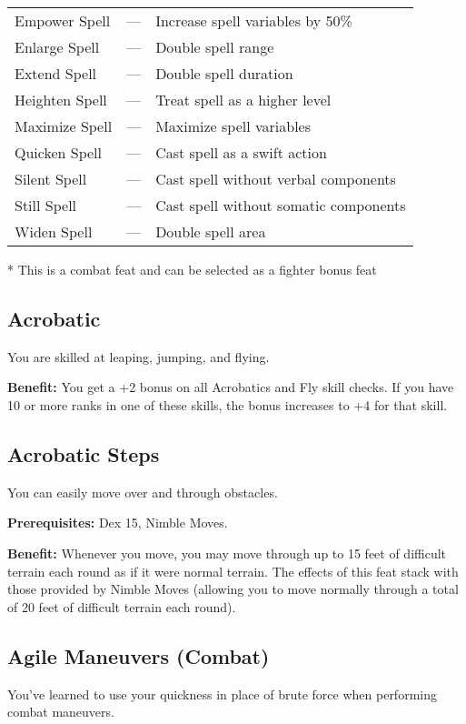 \begin{table}[]
\begin{tabular}{lll}
Empower Spell & — & Increase spell variables by 50\%\\
Enlarge Spell & — & Double spell range\\
Extend Spell & — & Double spell duration\\
Heighten Spell & — & Treat spell as a higher level\\
Maximize Spell & — & Maximize spell variables\\
Quicken Spell & — & Cast spell as a swift action\\
Silent Spell & — & Cast spell without verbal components\\
Still Spell & — & Cast spell without somatic components\\
Widen Spell & — & Double spell area\\
\end{tabular}
* This is a combat feat and can be selected as a fighter bonus feat
\end{table}

				
\subsection{Acrobatic}

				
You are skilled at leaping, jumping, and flying.
				
\textbf{Benefit:} You get a +2 bonus on all Acrobatics and Fly skill checks. If you have 10 or more ranks in one of these skills, the bonus increases to +4 for that skill.
				
\subsection{Acrobatic Steps}

				
You can easily move over and through obstacles.
				
\textbf{Prerequisites:} Dex 15, Nimble Moves.
				
\textbf{Benefit:} Whenever you move, you may move through up to 15 feet of difficult terrain each round as if it were normal terrain. The effects of this feat stack with those provided by Nimble Moves (allowing you to move normally through a total of 20 feet of difficult terrain each round).
				
\subsection{Agile Maneuvers (Combat)}

				
You've learned to use your quickness in place of brute force when performing combat maneuvers.
				

